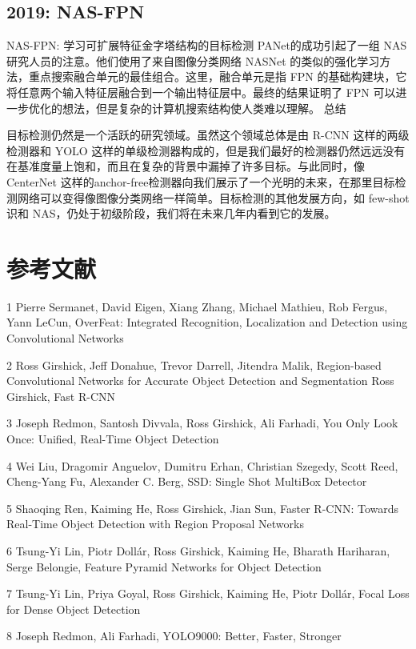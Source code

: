 \documentclass{article}
\begin{document}
    \subsection{2019: NAS-FPN}	
	
	NAS-FPN: 学习可扩展特征金字塔结构的目标检测
	PANet的成功引起了一组 NAS 研究人员的注意。他们使用了来自图像分类网络 NASNet 的类似的强化学习方法，重点搜索融合单元的最佳组合。这里，融合单元是指 FPN 的基础构建块，它将任意两个输入特征层融合到一个输出特征层中。最终的结果证明了 FPN 可以进一步优化的想法，但是复杂的计算机搜索结构使人类难以理解。
	总结
	
	目标检测仍然是一个活跃的研究领域。虽然这个领域总体是由 R-CNN 这样的两级检测器和 YOLO 这样的单级检测器构成的，但是我们最好的检测器仍然远远没有在基准度量上饱和，而且在复杂的背景中漏掉了许多目标。与此同时，像 CenterNet 这样的anchor-free检测器向我们展示了一个光明的未来，在那里目标检测网络可以变得像图像分类网络一样简单。目标检测的其他发展方向，如 few-shot 识和 NAS，仍处于初级阶段，我们将在未来几年内看到它的发展。
	
	\section{参考文献}
	1 Pierre Sermanet, David Eigen, Xiang Zhang, Michael Mathieu, Rob Fergus, Yann LeCun, OverFeat: Integrated Recognition, Localization and Detection using Convolutional Networks
	
	2 Ross Girshick, Jeff Donahue, Trevor Darrell, Jitendra Malik, Region-based Convolutional Networks for Accurate Object Detection and Segmentation
	Ross Girshick, Fast R-CNN
	
	3 Joseph Redmon, Santosh Divvala, Ross Girshick, Ali Farhadi, You Only Look Once: Unified, Real-Time Object Detection
	
	4 Wei Liu, Dragomir Anguelov, Dumitru Erhan, Christian Szegedy, Scott Reed, Cheng-Yang Fu, Alexander C. Berg, SSD: Single Shot MultiBox Detector
	
	5 Shaoqing Ren, Kaiming He, Ross Girshick, Jian Sun, Faster R-CNN: Towards Real-Time Object Detection with Region Proposal Networks
	
	6 Tsung-Yi Lin, Piotr Dollár, Ross Girshick, Kaiming He, Bharath Hariharan, Serge Belongie, Feature Pyramid Networks for Object Detection
	
	7 Tsung-Yi Lin, Priya Goyal, Ross Girshick, Kaiming He, Piotr Dollár, Focal Loss for Dense Object Detection
	
	8 Joseph Redmon, Ali Farhadi, YOLO9000: Better, Faster, Stronger
	
\end{document}
